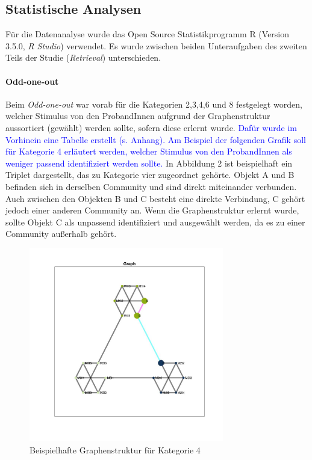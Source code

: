 \subsection{Statistische Analysen}
Für die Datenanalyse wurde das Open Source Statistikprogramm R (Version 3.5.0, \textit{R Studio}) verwendet.
Es wurde zwischen beiden Unteraufgaben des zweiten Teils der Studie (\textit{Retrieval}) unterschieden.

\paragraph{Odd-one-out}
Beim \textit{Odd-one-out} war vorab für die Kategorien 2,3,4,6 und 8 festgelegt worden, welcher Stimulus von den ProbandInnen aufgrund der Graphenstruktur aussortiert (gewählt) werden sollte, sofern diese erlernt wurde. \textcolor{blue}{Dafür wurde im Vorhinein eine Tabelle erstellt (s. Anhang). Am Beispiel der folgenden Grafik soll für Kategorie 4 erläutert werden, welcher Stimulus von den ProbandInnen als weniger passend identifiziert werden sollte.}
In Abbildung 2 ist beispielhaft ein Triplet dargestellt, das zu Kategorie vier zugeordnet gehörte. Objekt A und B befinden sich in derselben Community und sind direkt miteinander verbunden. Auch zwischen den Objekten B und C besteht eine direkte Verbindung, C gehört jedoch einer anderen Community an. Wenn die Graphenstruktur erlernt wurde, sollte Objekt C als unpassend identifiziert und ausgewählt werden, da es zu einer Community außerhalb gehört.

\begin{figure}[h]
    \centering
    \includegraphics[width=85mm]{cat04_2716_tripletVisual.jpg}
    \caption{Beispielhafte Graphenstruktur für Kategorie 4}
    \label{fig:my_label}
\end{figure}


